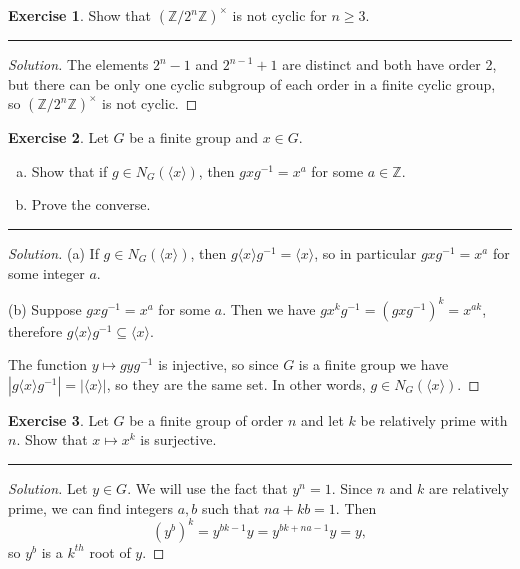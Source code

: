 \documentclass{article}
\theoremstyle{definition}
\newtheorem{exercise}{Exercise}
\begin{document}
\pagebreak

\begin{exercise}
  Show that $(\mathbb{Z}/2^n\mathbb{Z})^\times$ is not cyclic for $n\ge 3$.
\end{exercise}
\hrule
\begin{proof}[Solution]
  The elements $2^n - 1$ and $2^{n-1} + 1$ are distinct and both have order 2, but there can be only one cyclic subgroup of each order in a finite cyclic group, so $(\mathbb{Z}/2^{n}\mathbb{Z})^\times$ is not cyclic.
\end{proof}

\pagebreak

\begin{exercise}
  Let $G$ be a finite group and $x\in G$.
  \begin{enumerate}[(a)]
    \item Show that if $g\in N_G(\langle x\rangle)$, then $gxg^{-1} = x^a$ for some $a\in \mathbb{Z}$.
    \item Prove the converse.
  \end{enumerate}
\end{exercise}
\hrule
\begin{proof}[Solution]
  (a) If $g\in N_G(\langle x\rangle)$, then $g\langle x\rangle g^{-1} = \langle x\rangle$, so in particular $gxg^{-1} = x^a$ for some integer $a$.
  
  \vspace{0.5em}
  (b) Suppose $gxg^{-1} = x^a$ for some $a$. Then we have $gx^kg^{-1} = (gxg^{-1})^k = x^{ak}$, therefore $g\langle x\rangle g^{-1}\subseteq \langle x\rangle$.

  The function $y \mapsto gyg^{-1}$ is injective, so since $G$ is a finite group we have $|g\langle x\rangle g^{-1}| = |\langle x\rangle|$, so they are the same set. In other words, $g\in N_G(\langle x\rangle)$.
\end{proof}

\pagebreak

\begin{exercise}
  Let $G$ be a finite group of order $n$ and let $k$ be relatively prime with $n$. Show that $x\mapsto x^k$ is surjective.
\end{exercise}
\hrule
\begin{proof}[Solution]
  Let $y\in G$. We will use the fact that $y^n = 1$. Since $n$ and $k$ are relatively prime, we can find integers $a,b$ such that $na + kb = 1$. Then
  $$(y^b)^k = y^{bk-1}y = y^{bk+na-1}y = y,$$
  so $y^b$ is a $k^{th}$ root of $y$.
\end{proof}
\end{document}
